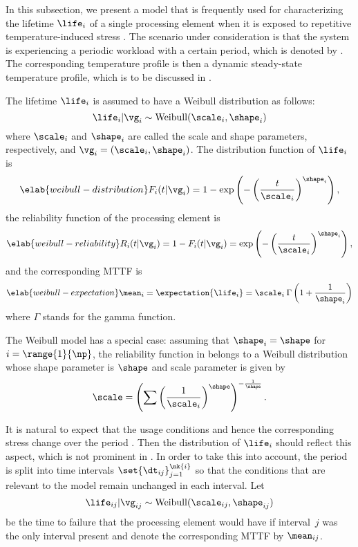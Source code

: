 In this subsection, we present a model that is frequently used for
characterizing the lifetime $\life_i$ of a single processing element when it is
exposed to repetitive temperature-induced stress \cite{huang2009b, xiang2010}.
The scenario under consideration is that the system is experiencing a periodic
workload with a certain period, which is denoted by \period. The corresponding
temperature profile is then a dynamic steady-state temperature profile, which is
to be discussed in .

The lifetime $\life_i$ is assumed to have a Weibull distribution as follows:
\[
  \life_i | \vg_i \sim \mathrm{Weibull}(\scale_i, \shape_i)
\]
where $\scale_i$ and $\shape_i$ are called the scale and shape parameters,
respectively, and $\vg_i = (\scale_i, \shape_i)$. The distribution function of
$\life_i$ is
\begin{equation} \elab{weibull-distribution}
  F_i(t | \vg_i) = 1 - \exp\left(-\left(\frac{t}{\scale_i}\right)^{\shape_i}\right),
\end{equation}
the reliability function of the processing element is
\begin{equation} \elab{weibull-reliability}
  R_i(t | \vg_i) = 1 - F_i(t | \vg_i) = \exp\left(-\left(\frac{t}{\scale_i}\right)^{\shape_i}\right),
\end{equation}
and the corresponding \ac{MTTF} is
\begin{equation} \elab{weibull-expectation}
  \mean_i = \expectation{\life_i} = \scale_i \: \Gamma\left(1 + \frac{1}{\shape_i}\right)
\end{equation}
where $\Gamma$ stands for the gamma function.

\begin{remark} 
The Weibull model has a special case: assuming that $\shape_i = \shape$ for $i =
\range{1}{\np}$, the reliability function in  belongs to
a Weibull distribution whose shape parameter is $\shape$ and scale parameter is
given by
\[
  \scale = \left(\sum\left(\frac{1}{\scale_i}\right)^\shape\right)^{-\frac{1}{\shape}}.
\]
\end{remark}

It is natural to expect that the usage conditions and hence the corresponding
stress change over the period \period. Then the distribution of $\life_i$ should
reflect this aspect, which is not prominent in . In
order to take this into account, the period is split into  time intervals
$\set{\dt_{ij}}_{j = 1}^{\nk{i}}$ so that the conditions that are relevant to
the model remain unchanged in each interval. Let
\[
  \life_{ij} | \vg_{ij} \sim \mathrm{Weibull}(\scale_{ij}, \shape_{ij})
\]
be the time to failure that the processing element would have if interval~$j$
was the only interval present and denote the corresponding \ac{MTTF} by
$\mean_{ij}$.

